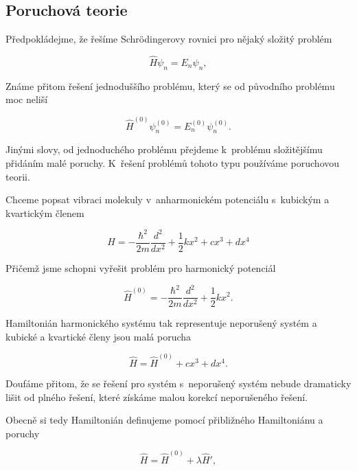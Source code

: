 \subsection{Poruchová teorie}
\label{kap:PoruchovaTeorie}
 
Předpokládejme, že řešíme Schr\"odingerovy rovnici pro nějaký složitý problém

\begin{equation}
\hat{H}\psi_n=E_n \psi_n,
\end{equation}


\noindent Známe přitom řešení jednoduššího problému, který se od původního problému moc neliší
 
\begin{equation}
\hat{H}^{(0)}\psi_n^{(0)}=E_n^{(0)} \psi_n^{(0)}.
\end{equation}
 
\noindent Jinými slovy, od jednoduchého problému přejdeme k~problému složitějšímu přidáním malé poruchy. K~řešení problémů tohoto typu používáme poruchovou teorii.
 
\begin{priklad} 
Chceme popsat vibraci molekuly v~anharmonickém potenciálu s~kubickým a kvartickým členem
  
\begin{equation}
\hat{H}=-\frac{\hbar^2}{2m}\frac{d^2}{dx^2}+\frac{1}{2}kx^2+cx^3+dx^4
\nonumber
\end{equation}
 
Přičemž jsme schopni vyřešit problém pro harmonický potenciál
 
\begin{equation}
\hat{H}^{(0)}=-\frac{\hbar^2}{2m}\frac{d^2}{dx^2}+\frac{1}{2}kx^2.
\nonumber
\end{equation}
 
Hamiltonián harmonického systému tak representuje neporušený systém a kubické a kvartické členy jsou malá porucha
 
\begin{equation}
\hat{H}=\hat{H}^{(0)}+cx^3+dx^4.
\end{equation}

Doufáme přitom, že se řešení pro systém s~neporušený systém nebude dramaticky lišit od plného řešení, které získáme malou korekcí neporušeného řešení.
\end{priklad}

Obecně si tedy Hamiltonián definujeme pomocí přibližného Hamiltoniánu a poruchy

\begin{equation}
\hat{H}=\hat{H}^{(0)}+\lambda\hat{H}',
\end{equation}

